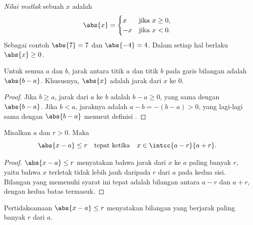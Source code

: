 \begin{definition}\label{def:g10:numbers:abs}
\emph{Nilai mutlak} sebuah  $x$ adalah
\[
\abs{x} =
\begin{cases}
x & \text{jika } x \geq 0, \\
-x & \text{jika } x < 0.
\end{cases}
\]
Sebagai contoh $\abs{7} = 7$ dan $\abs{-4} = 4$. Dalam setiap hal berlaku
$\abs{x} \geq 0$.
\end{definition}

\begin{proposition}\label{prop:g10:numbers:distance}
Untuk semua  $a$ dan $b$, jarak antara titik $a$ dan titik
$b$ pada garis bilangan adalah $\abs{b - a}$. Khususnya, $\abs{x}$ adalah
jarak dari $x$ ke $0$.
\end{proposition}

\begin{proof}
Jika $b \geq a$, jarak dari $a$ ke $b$ adalah $b - a \geq 0$, yang sama
dengan $\abs{b-a}$. Jika $b < a$, jaraknya adalah $a - b = -(b - a) > 0$,
yang lagi-lagi sama dengan $\abs{b - a}$ menurut definisi .
\end{proof}

\begin{proposition}\label{prop:g10:numbers:absinterval}
Misalkan $a$  dan $r > 0$. Maka
\[
\abs{x - a} \leq r
\quad\text{tepat ketika}\quad
x \in \intcc{a - r}{a + r}.
\]
\end{proposition}

\begin{proof}
$\abs{x-a} \leq r$ menyatakan bahwa jarak dari $x$ ke $a$ paling banyak $r$,
yaitu bahwa $x$ terletak tidak lebih jauh daripada $r$ dari $a$ pada kedua
sisi. Bilangan yang memenuhi syarat ini tepat adalah bilangan antara $a - r$
dan $a + r$, dengan kedua batas termasuk.
\end{proof}

\begin{omfigure}

{\small Pertidaksamaan $\abs{x - a} \leq r$ menyatakan  bilangan yang
berjarak paling banyak $r$ dari $a$.}
\end{omfigure}

